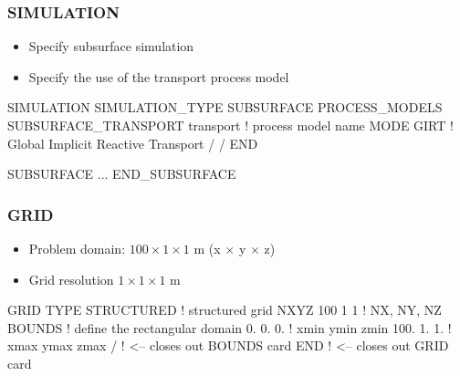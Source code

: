 \documentclass{beamer}
\newcommand\redcomment[1]{{{\color{red} #1}}}
\newcommand\bluecomment[1]{{{\color{blue} #1}}}
\begin{document}
\begin{frame}[fragile]\frametitle{SIMULATION}

\begin{itemize}
  \item Specify subsurface simulation
  \item Specify the use of the transport process model
\end{itemize}


\begin{semiverbatim}

SIMULATION
  SIMULATION_TYPE SUBSURFACE
  PROCESS_MODELS
    SUBSURFACE_TRANSPORT transport \bluecomment{! process model name}
      MODE GIRT   \bluecomment{! \redcomment{G}lobal \redcomment{I}mplicit \redcomment{R}eactive \redcomment{T}ransport}
    /
  /
END

SUBSURFACE
  ...
END_SUBSURFACE
\end{semiverbatim}

\end{frame}

\begin{frame}\frametitle{GRID}

\begin{itemize}
  \item Problem domain: $100 \times 1 \times 1$ m (x $\times$ y $\times$ z)
  \item Grid resolution $1 \times 1 \times 1$ m
\end{itemize}

\begin{semiverbatim}
GRID
  TYPE STRUCTURED     \bluecomment{! structured grid}
  NXYZ 100 1 1        \bluecomment{! NX, NY, NZ}
  BOUNDS              \bluecomment{! define the rectangular domain}
    0. 0. 0.          \bluecomment{! xmin ymin zmin}
    100. 1. 1.        \bluecomment{! xmax ymax zmax}
  /  \bluecomment{! <-- closes out BOUNDS card}
END  \bluecomment{! <-- closes out GRID card}
\end{semiverbatim}

\end{frame}
\end{document}
